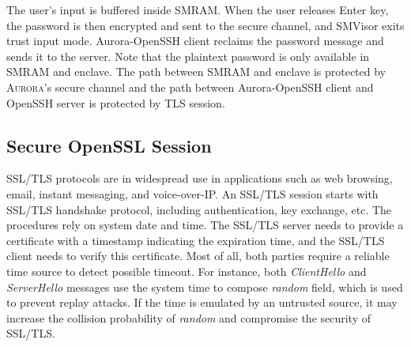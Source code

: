 The user's input is buffered inside SMRAM. When the user releases \textsf{Enter} key, the password is then encrypted and sent to the secure channel, and SMVisor exits trust input mode.  Aurora-OpenSSH client reclaims the password message and sends it to the server. Note that the plaintext password is only available in SMRAM and enclave. The path between SMRAM and enclave is protected by \textsc{Aurora}'s secure channel and the path between Aurora-OpenSSH client and OpenSSH server is protected by TLS session.
%

\subsection{Secure OpenSSL Session}\label{openssl}

SSL/TLS protocols are in widespread use in applications such as web browsing, email, instant messaging, and voice-over-IP. 
An SSL/TLS session starts with SSL/TLS handshake protocol, including authentication, key exchange, etc. The procedures rely on system date and time. The SSL/TLS server needs to provide a certificate with a timestamp indicating the expiration time, and the SSL/TLS client needs to verify this certificate. Most of all, both parties require a reliable time source to detect possible timeout. For instance, both \emph{ClientHello} and \emph{ServerHello} messages use the system time to compose \textit{random} field, which is used to prevent replay attacks. If the time is emulated by an untrusted source, it may increase the collision probability of \emph{random} and compromise the security of SSL/TLS.

